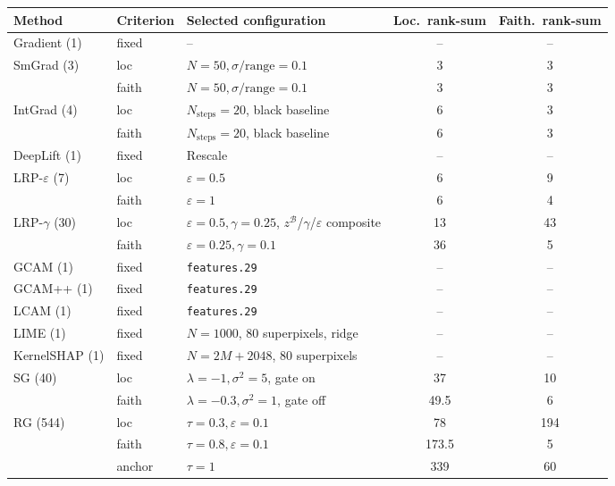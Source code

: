 \begin{tabular}{@{}l l l c c@{}}
\toprule
Method & Criterion & Selected configuration & Loc.\ rank-sum & Faith.\ rank-sum \\
\midrule
Gradient (1) & fixed & -- & -- & -- \\
\addlinespace
SmGrad (3) & loc & $N{=}50,\sigma/\mathrm{range}{=}0.1$ & 3 & 3 \\
 & faith & $N{=}50,\sigma/\mathrm{range}{=}0.1$ & 3 & 3 \\
\addlinespace
IntGrad (4) & loc & $N_{\mathrm{steps}}{=}20$, black baseline & 6 & 3 \\
 & faith & $N_{\mathrm{steps}}{=}20$, black baseline & 6 & 3 \\
\addlinespace
DeepLift (1) & fixed & Rescale & -- & -- \\
\addlinespace
LRP-$\varepsilon$ (7) & loc & $\varepsilon{=}0.5$ & 6 & 9 \\
 & faith & $\varepsilon{=}1$ & 6 & 4 \\
\addlinespace
LRP-$\gamma$ (30) & loc & $\varepsilon{=}0.5,\gamma{=}0.25$, $z^{\mathcal{B}}$/$\gamma$/$\varepsilon$ composite & 13 & 43 \\
 & faith & $\varepsilon{=}0.25,\gamma{=}0.1$ & 36 & 5 \\
\addlinespace
GCAM (1) & fixed & \texttt{features.29} & -- & -- \\
\addlinespace
GCAM++ (1) & fixed & \texttt{features.29} & -- & -- \\
\addlinespace
LCAM (1) & fixed & \texttt{features.29} & -- & -- \\
\addlinespace
LIME (1) & fixed & $N{=}1000$, 80 superpixels, ridge & -- & -- \\
\addlinespace
KernelSHAP (1) & fixed & $N{=}2M{+}2048$, 80 superpixels & -- & -- \\
\addlinespace
SG (40) & loc & $\lambda{=}{-}1,\sigma^2{=}5$, gate on & 37 & 10 \\
 & faith & $\lambda{=}{-}0.3,\sigma^2{=}1$, gate off & 49.5 & 6 \\
\addlinespace
RG (544) & loc & $\tau{=}0.3,\varepsilon{=}0.1$ & 78 & 194 \\
 & faith & $\tau{=}0.8,\varepsilon{=}0.1$ & 173.5 & 5 \\
 & anchor & $\tau{=}1$ & 339 & 60 \\
\bottomrule
\end{tabular}
